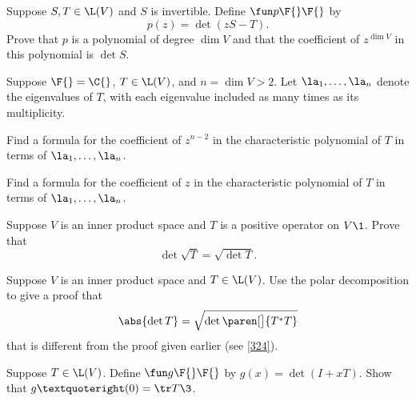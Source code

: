\exercise
Suppose $S, T \in \L(V)$ and $S$ is invertible. Define $\fun p {\F{}} {\F{}}$ by
\[
p(z) = \det(zS - T).
\]
Prove that $p$ is a polynomial of degree $\dim V$ and that the coefficient of $z^{\dim V}$ in this polynomial is $\det S$.


\exercise
Suppose $\F{} = \C{}$, $T \in \L(V)$, and $n = \dim V > 2$. Let $\la_1, \ldots, \la_n$ denote the eigenvalues of $T$, with each eigenvalue included as many times as its multiplicity.
\begin{subtheorem}
\item
Find a formula for the coefficient of $z^{n-2}$ in the characteristic polynomial of $T$ in terms of
$\la_1, \ldots, \la_n$.
\item
Find a formula for the coefficient of $z$ in the characteristic polynomial of $T$ in terms of
$\la_1, \ldots, \la_n$.
\end{subtheorem}
\exercisesubtheoremend


\exercise
Suppose $V$ is an inner product space and $T$ is a positive operator on $V\1$. Prove that\label{9detsq}
\[
\det \sqrt{T} = \sqrt{ \det T }.
\]
\exercisedisplayend


\exercise
Suppose $V$ is an inner product space and $T \in \L(V)$. Use the polar decomposition to give a proof that
\[
\abs{\det T} = \sqrt{\det\paren[\big]{T^*T}}
\]
that is different from the proof given earlier (see \ref{324}).


\exercise
Suppose $T \in \L(V)$. Define $\fun g {\F{}} {\F{}}$ by
$
g(x) = \det(I + xT)$.
Show that $g’(0) = \tr T\3$.


